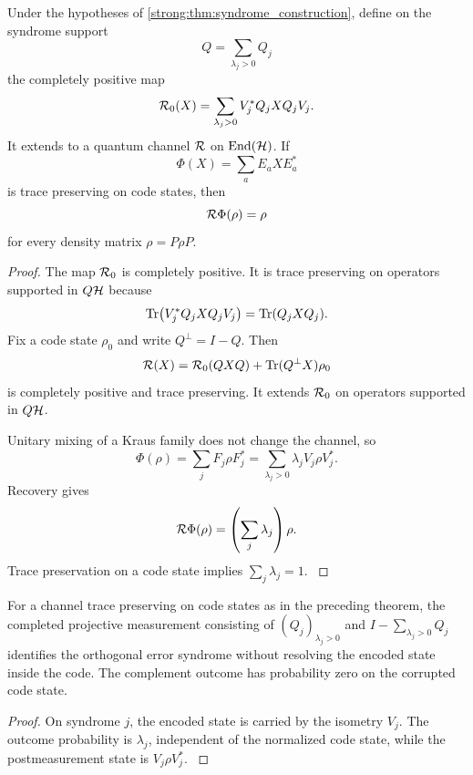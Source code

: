 \begin{theorem}\label{strong:theorem:028}\label{strong:thm:exact_recovery}
Under the hypotheses of \cref{strong:thm:syndrome_construction}, define on the syndrome support
\[
Q=\sum_{\lambda_j>0}Q_j
\]
the completely positive map
\[
\Rcal_0(X)
=
\sum_{\lambda_j>0}
V_j^*Q_jXQ_jV_j.
\]
It extends to a quantum channel \(\Rcal\) on \(\End(\Hcal)\). If
\[
\Phi(X)=\sum_aE_aXE_a^*
\]
is trace preserving on code states, then
\[
\Rcal\Phi(\rho)=\rho
\]
for every density matrix \(\rho=P\rho P\).
\end{theorem}

\begin{proof}\label{strong:proof:041}
The map \(\Rcal_0\) is completely positive. It is trace preserving on operators supported in \(Q\Hcal\) because
\[
\operatorname{Tr}\bigl(V_j^*Q_jXQ_jV_j\bigr)
=
\operatorname{Tr}(Q_jXQ_j).
\]
Fix a code state \(\rho_0\) and write \(Q^\perp=I-Q\). Then
\[
\Rcal(X)
=
\Rcal_0(QXQ)
+
\Tr(Q^\perp X)\rho_0
\]
is completely positive and trace preserving. It extends \(\Rcal_0\) on operators supported in \(Q\Hcal\).

Unitary mixing of a Kraus family does not change the channel, so
\[
\Phi(\rho)
=
\sum_jF_j\rho F_j^*
=
\sum_{\lambda_j>0}
\lambda_jV_j\rho V_j^*.
\]
Recovery gives
\[
\Rcal\Phi(\rho)
=
\left(\sum_j\lambda_j\right)\rho.
\]
Trace preservation on a code state implies \(\sum_j\lambda_j=1\).
\label{strong:proof:041:end}\end{proof}

\begin{corollary}\label{strong:corollary:011}\label{strong:cor:syndrome_preserves_logic}
For a channel trace preserving on code states as in the preceding theorem, the completed projective measurement consisting of \((Q_j)_{\lambda_j>0}\) and \(I-\sum_{\lambda_j>0}Q_j\) identifies the orthogonal error syndrome without resolving the encoded state inside the code. The complement outcome has probability zero on the corrupted code state.
\end{corollary}

\begin{proof}\label{strong:proof:042}
On syndrome \(j\), the encoded state is carried by the isometry \(V_j\). The outcome probability is \(\lambda_j\), independent of the normalized code state, while the postmeasurement state is \(V_j\rho V_j^*\).
\label{strong:proof:042:end}\end{proof}

